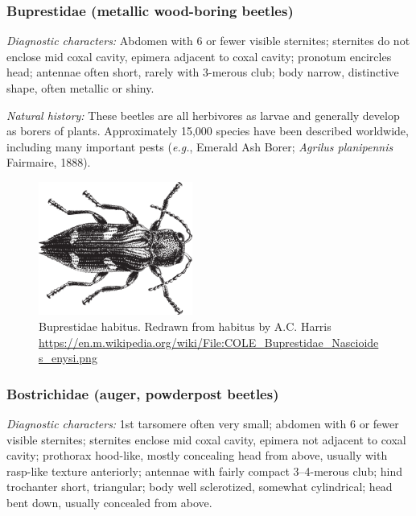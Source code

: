 \subsubsection{Buprestidae (metallic wood-boring beetles)}
\noindent{}\textit{Diagnostic characters:} Abdomen with 6 or fewer visible sternites; sternites do not enclose mid coxal cavity, epimera adjacent to coxal cavity; pronotum encircles head; antennae often short, rarely with 3-merous club; body narrow, distinctive shape, often metallic or shiny.\vspace{3mm}

\noindent{}\textit{Natural history:} These beetles are all herbivores as larvae and generally develop as borers of plants. Approximately 15,000 species have been described worldwide, including many important pests (\textit{e.g.}, Emerald Ash Borer; \textit{Agrilus planipennis} Fairmaire, 1888).

\begin{figure}[ht!]
  \centering
     \includegraphics[width=0.45\textwidth]{sections/img/coleopterida/Buprestidae.pdf}
  \caption{Buprestidae habitus. Redrawn from habitus by A.C. Harris  \url{https://en.m.wikipedia.org/wiki/File:COLE_Buprestidae_Nascioides_enysi.png}}
  \label{fig:buprestid}
\end{figure}

\subsubsection{Bostrichidae (auger, powderpost beetles)}
\noindent{}\textit{Diagnostic characters:} 1st tarsomere often very small; abdomen with 6 or fewer visible sternites; sternites enclose mid coxal cavity, epimera not adjacent to coxal cavity; prothorax hood-like, mostly concealing head from above, usually with rasp-like texture anteriorly; antennae with fairly compact 3--4-merous club; hind trochanter short, triangular; body well sclerotized, somewhat cylindrical; head bent down, usually concealed from above.\vspace{3mm}


